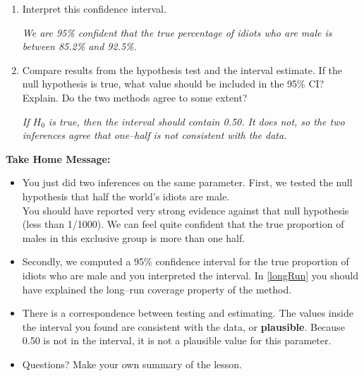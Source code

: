 \begin{enumerate}
\begin{enumerate}
\begin{key} 
  {\it Our confidence is in the process, not in just one interval. If
    we repeat the process (gather a new random sample) over and over,
    95\% of the intervals we create will include the true parameter of
  interest.}
\end{key}

  \end{enumerate}
\item Interpret this confidence interval.
\begin{students}
    \vspace{2cm}    
\end{students}

\begin{key} 
  {\it We are 95\% confident that the true percentage of idiots who
    are male is between 85.2\% and 92.5\%.}
\end{key}


\item Compare results from the hypothesis test and the interval
  estimate.  If the null hypothesis is true, what value should be
  included in the 95\% CI?  Explain. Do the two methods agree to some
  extent? 
\begin{students}
    \vspace{3.5cm}    
\end{students}

\begin{key} 
  {\it  If $H_0$ is true, then the interval should contain 0.50.  It
    does not, so the two inferences agree that one--half is not
    consistent with the data.} 
\end{key}
\end{enumerate}


\begin{center}
  {\bf Take Home Message:}
\end{center}
\begin{itemize}
  \item You just did two inferences on the same parameter.  First, we
    tested the null hypothesis that half the world's idiots are
    male.\\
      You should have reported very strong evidence against that null
      hypothesis (less than 1/1000). We can feel quite confident that
      the true proportion 
      of males in this exclusive group is more than one half.

  \item Secondly, we computed a 95\% confidence interval for the true
    proportion of idiots who are male and you interpreted the
    interval.  In \ref{longRun} you should have explained the
    long--run coverage property of the method.
  \item   There is a correspondence
    between testing and estimating.  The values inside the interval
    you found are consistent with the data, or {\bf plausible}.  Because
    0.50 is not in the interval, it is not a plausible value for this
    parameter. 
 \item 
  Questions? Make your own summary of the  lesson. \vfill

\end{itemize}

